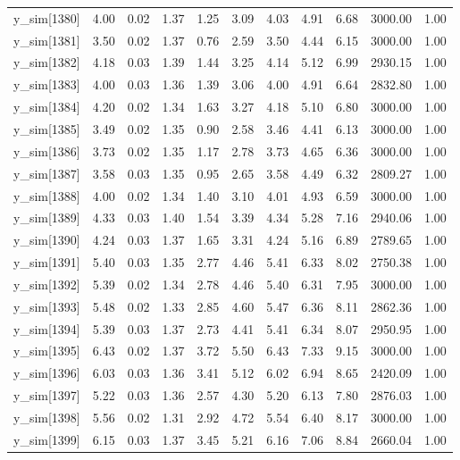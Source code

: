 \begin{table}[ht]
\begin{tabular}{rrrrrrrrrrr}
  y\_sim[1380] & 4.00 & 0.02 & 1.37 & 1.25 & 3.09 & 4.03 & 4.91 & 6.68 & 3000.00 & 1.00 \\ 
  y\_sim[1381] & 3.50 & 0.02 & 1.37 & 0.76 & 2.59 & 3.50 & 4.44 & 6.15 & 3000.00 & 1.00 \\ 
  y\_sim[1382] & 4.18 & 0.03 & 1.39 & 1.44 & 3.25 & 4.14 & 5.12 & 6.99 & 2930.15 & 1.00 \\ 
  y\_sim[1383] & 4.00 & 0.03 & 1.36 & 1.39 & 3.06 & 4.00 & 4.91 & 6.64 & 2832.80 & 1.00 \\ 
  y\_sim[1384] & 4.20 & 0.02 & 1.34 & 1.63 & 3.27 & 4.18 & 5.10 & 6.80 & 3000.00 & 1.00 \\ 
  y\_sim[1385] & 3.49 & 0.02 & 1.35 & 0.90 & 2.58 & 3.46 & 4.41 & 6.13 & 3000.00 & 1.00 \\ 
  y\_sim[1386] & 3.73 & 0.02 & 1.35 & 1.17 & 2.78 & 3.73 & 4.65 & 6.36 & 3000.00 & 1.00 \\ 
  y\_sim[1387] & 3.58 & 0.03 & 1.35 & 0.95 & 2.65 & 3.58 & 4.49 & 6.32 & 2809.27 & 1.00 \\ 
  y\_sim[1388] & 4.00 & 0.02 & 1.34 & 1.40 & 3.10 & 4.01 & 4.93 & 6.59 & 3000.00 & 1.00 \\ 
  y\_sim[1389] & 4.33 & 0.03 & 1.40 & 1.54 & 3.39 & 4.34 & 5.28 & 7.16 & 2940.06 & 1.00 \\ 
  y\_sim[1390] & 4.24 & 0.03 & 1.37 & 1.65 & 3.31 & 4.24 & 5.16 & 6.89 & 2789.65 & 1.00 \\ 
  y\_sim[1391] & 5.40 & 0.03 & 1.35 & 2.77 & 4.46 & 5.41 & 6.33 & 8.02 & 2750.38 & 1.00 \\ 
  y\_sim[1392] & 5.39 & 0.02 & 1.34 & 2.78 & 4.46 & 5.40 & 6.31 & 7.95 & 3000.00 & 1.00 \\ 
  y\_sim[1393] & 5.48 & 0.02 & 1.33 & 2.85 & 4.60 & 5.47 & 6.36 & 8.11 & 2862.36 & 1.00 \\ 
  y\_sim[1394] & 5.39 & 0.03 & 1.37 & 2.73 & 4.41 & 5.41 & 6.34 & 8.07 & 2950.95 & 1.00 \\ 
  y\_sim[1395] & 6.43 & 0.02 & 1.37 & 3.72 & 5.50 & 6.43 & 7.33 & 9.15 & 3000.00 & 1.00 \\ 
  y\_sim[1396] & 6.03 & 0.03 & 1.36 & 3.41 & 5.12 & 6.02 & 6.94 & 8.65 & 2420.09 & 1.00 \\ 
  y\_sim[1397] & 5.22 & 0.03 & 1.36 & 2.57 & 4.30 & 5.20 & 6.13 & 7.80 & 2876.03 & 1.00 \\ 
  y\_sim[1398] & 5.56 & 0.02 & 1.31 & 2.92 & 4.72 & 5.54 & 6.40 & 8.17 & 3000.00 & 1.00 \\ 
  y\_sim[1399] & 6.15 & 0.03 & 1.37 & 3.45 & 5.21 & 6.16 & 7.06 & 8.84 & 2660.04 & 1.00 \\ 

\end{tabular}
\end{table}

